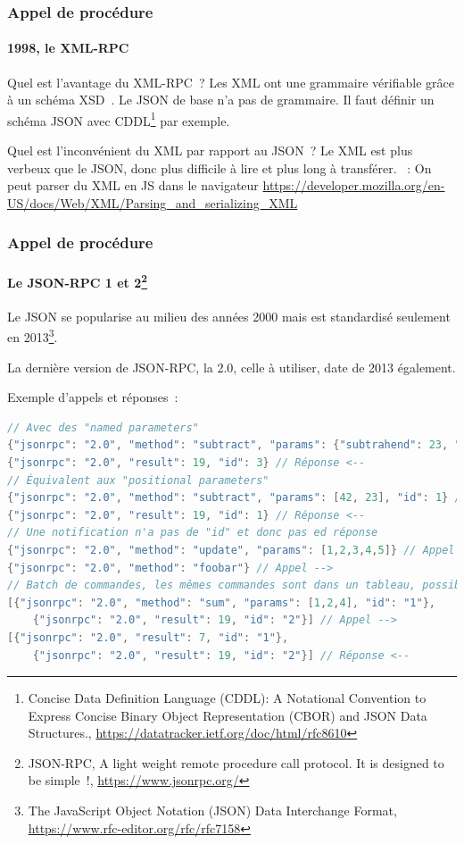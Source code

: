 \documentclass{beamer}
\begin{document}
    \begin{frame}
        \transdissolve
        \frametitle{Appel de procédure}
        \framesubtitle{1998, le XML-RPC}
        Quel est l'avantage du XML-RPC~?
        \pause
        \bigbreak
        Les XML ont une grammaire vérifiable grâce à un schéma XSD~.
        Le JSON de base n'a pas de grammaire.
        Il faut définir un schéma JSON avec CDDL\footnote{Concise Data Definition Language (CDDL): A Notational Convention to Express Concise Binary Object Representation (CBOR) and JSON Data Structures., \url{https://datatracker.ietf.org/doc/html/rfc8610}} par exemple.

        Quel est l'inconvénient du XML par rapport au JSON~?
        \pause
        \bigbreak
        Le XML est plus verbeux que le JSON, donc plus difficile à lire et plus long à transférer.
        \bigbreak
        ~: On peut parser du XML en JS dans le navigateur \url{https://developer.mozilla.org/en-US/docs/Web/XML/Parsing_and_serializing_XML}
    \end{frame}

    \begin{frame}[fragile]
        \transdissolve
        \frametitle{Appel de procédure}
        \framesubtitle{Le JSON-RPC 1 et 2\footnote{JSON-RPC, A light weight remote procedure call protocol. It is designed to be simple~!, \url{https://www.jsonrpc.org/}}}
        Le JSON se popularise au milieu des années 2000 mais est standardisé seulement en 2013\footnote{The JavaScript Object Notation (JSON) Data Interchange Format, \url{https://www.rfc-editor.org/rfc/rfc7158}}.

        La dernière version de JSON-RPC, la 2.0, celle à utiliser, date de 2013 également.

        Exemple d'appels et réponses~:
        \begin{lstlisting}[language=java,basicstyle=\ttfamily\tiny]
// Avec des "named parameters"
{"jsonrpc": "2.0", "method": "subtract", "params": {"subtrahend": 23, "minuend": 42}, "id": 3} // Appel -->
{"jsonrpc": "2.0", "result": 19, "id": 3} // Réponse <--
// Équivalent aux "positional parameters"
{"jsonrpc": "2.0", "method": "subtract", "params": [42, 23], "id": 1} // Appel -->
{"jsonrpc": "2.0", "result": 19, "id": 1} // Réponse <--
// Une notification n'a pas de "id" et donc pas ed réponse
{"jsonrpc": "2.0", "method": "update", "params": [1,2,3,4,5]} // Appel -->
{"jsonrpc": "2.0", "method": "foobar"} // Appel -->
// Batch de commandes, les mêmes commandes sont dans un tableau, possible pour les notifications également
[{"jsonrpc": "2.0", "method": "sum", "params": [1,2,4], "id": "1"},
    {"jsonrpc": "2.0", "result": 19, "id": "2"}] // Appel -->
[{"jsonrpc": "2.0", "result": 7, "id": "1"},
    {"jsonrpc": "2.0", "result": 19, "id": "2"}] // Réponse <--
        \end{lstlisting}
    \end{frame}
\end{document}

